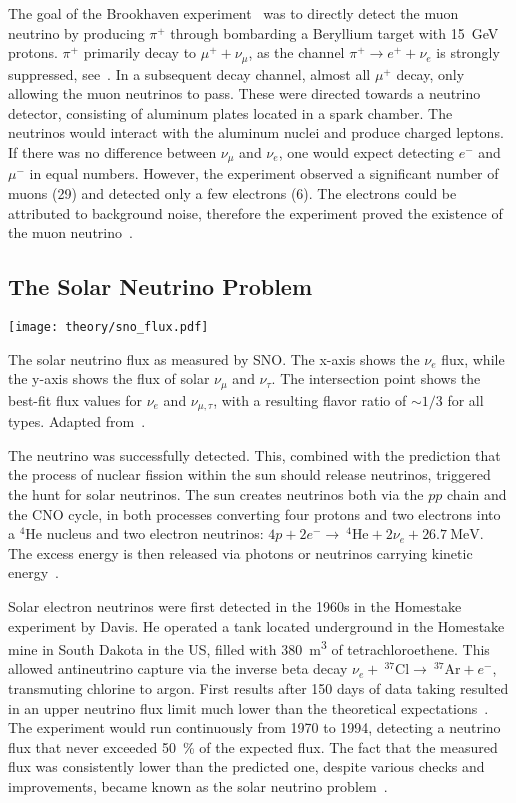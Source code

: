 The goal of the Brookhaven experiment~ was to directly detect the muon neutrino by producing $\pi^+$ through bombarding a Beryllium target with \SI{15}{\giga\eV} protons. $\pi^+$ primarily decay to $\mu^+ + \nu_\mu$, as the channel $\pi^+ \rightarrow e^+ + \nu_e$ is strongly suppressed, see~\cite{Bilenky2012}. In a subsequent decay channel, almost all $\mu^+$ decay, only allowing the muon neutrinos to pass. These were directed towards a neutrino detector, consisting of aluminum plates located in a spark chamber. The neutrinos would interact with the aluminum nuclei and produce charged leptons. If there was no difference between $\nu_\mu$ and $\nu_e$, one would expect detecting $e^-$ and $\mu^-$ in equal numbers. However, the experiment observed a significant number of muons (29) and detected only a few electrons (6). The electrons could be attributed to background noise, therefore the experiment proved the existence of the muon neutrino~\cite{Danby1962}.

\subsection{The Solar Neutrino Problem}

\begin{marginfigure}[-0.8cm]
    \texttt{[image: theory/sno\_flux.pdf]}
    \caption[Solar neutrino flux measured by SNO]{The solar neutrino flux as measured by SNO\@. The x-axis shows the $\nu_e$ flux, while the y-axis shows the flux of solar $\nu_\mu$ and $\nu_\tau$. The intersection point shows the best-fit flux values for $\nu_e$ and $\nu_{\mu,\tau}$, with a resulting flavor ratio of $\sim1/3$ for all types. Adapted from~\cite{Ahmad2002}.}
\end{marginfigure}

The neutrino was successfully detected. This, combined with the prediction that the process of nuclear fission within the sun should release neutrinos, triggered the hunt for solar neutrinos. The sun creates neutrinos both via the $pp$ chain and the CNO cycle, in both processes converting four protons and two electrons into a $^4\text{He}$ nucleus and two electron neutrinos: $4p + 2e^- \rightarrow  ~^4\text{He} + 2\nu_e + \SI{26.7}{\mega\eV}$. The excess energy is then released via photons or neutrinos carrying kinetic energy~\cite{Giunti2007}.

Solar electron neutrinos were first detected in the 1960s in the Homestake experiment by Davis. He operated a tank located underground in the Homestake mine in South Dakota in the US, filled with \SI{380}{\meter\cubed} of tetrachloroethene. This allowed antineutrino capture via the inverse beta decay $\nu_e +~ ^{37}\text{Cl} \rightarrow ~ ^{37}\text{Ar} + e^-$, transmuting chlorine to argon. First results after 150 days of data taking resulted in an upper neutrino flux limit much lower than the theoretical expectations~. The experiment would run continuously from 1970 to 1994, detecting a neutrino flux that never exceeded \SI{50}{\percent} of the expected flux. The fact that the measured flux was consistently lower than the predicted one, despite various checks and improvements, became known as the solar neutrino problem~.

